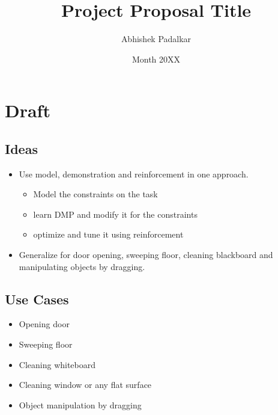 \documentclass[thesis]{mas_proposal}
\title{Project Proposal Title}
\author{Abhishek Padalkar}
\date{Month 20XX}
\begin{document}
\maketitle

\pagestyle{plain}

\chapter{Draft}

\section{Ideas}
\begin{itemize}
	\item Use model, demonstration and reinforcement in one approach.
	\begin{itemize}
		\item Model the constraints on the task
		\item learn DMP and modify it for the constraints
		\item optimize and tune it using reinforcement
	\end{itemize}
	\item Generalize for door opening, sweeping floor, cleaning blackboard and manipulating objects by dragging.
\end{itemize}

\section{Use Cases}
\begin{itemize}
	\item Opening door
	\item Sweeping floor
	\item Cleaning whiteboard
	\item Cleaning window or any flat surface
	\item Object manipulation by dragging
\end{itemize}
\end{document}
